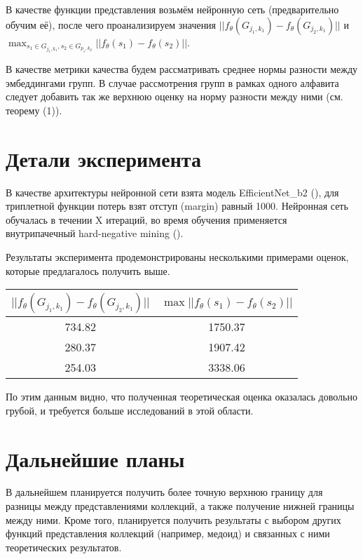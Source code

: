 \documentclass{article}
\begin{document}
В качестве функции представления возьмём нейронную сеть (предварительно обучим её), после чего проанализируем значения $||f_\theta(G_{j_1, k_1}) - f_\theta(G_{j_2, k_1})||$ и $\max_{s_1 \in G_{j_1, k_1}, s_2 \in G_{p_1, k_2}}{||f_{\theta}(s_1) - f_{\theta}(s_2)||}$.

В качестве метрики качества будем рассматривать среднее нормы разности между эмбеддингами групп. В случае рассмотрения групп в рамках одного алфавита следует добавить так же верхнюю оценку на норму разности между ними (см. теорему (1)).

\section{Детали эксперимента}

В качестве архитектуры нейронной сети взята модель EfficientNet\_b2 (\cite{tan2020efficientnet}), для триплетной функции потерь взят отступ (margin) равный 1000. Нейронная сеть обучалась в течении X итераций, во время обучения применяется внутрипачечный hard-negative mining (\cite{Bootstrapping}).

Результаты эксперимента продемонстрированы несколькими примерами оценок, которые предлагалось получить выше.
\newline

\begin{center}
\renewcommand{\arraystretch}{1.5}

\begin{tabular}[H]{ | c | c | }
 \hline
 $||f_\theta(G_{j_1, k_1}) - f_\theta(G_{j_2, k_1})||$ & $\max{||f_{\theta}(s_1) - f_{\theta}(s_2)||}$\\
 \hline
  734.82 & 1750.37 \\
  280.37 & 1907.42 \\
  254.03 & 3338.06\\
 \hline
\end{tabular}
\end{center}


По этим данным видно, что полученная теоретическая оценка оказалась довольно грубой, и требуется больше исследований в этой области.

\section{Дальнейшие планы}

В дальнейшем планируется получить более точную верхнюю границу для разницы между представлениями коллекций, а также получение нижней границы между ними. Кроме того, планируется получить результаты с выбором других функций представления коллекций (например, медоид) и связанных с ними теоретических результатов.

\newpage
\nocite{*}


\printbibliography
\end{document}
